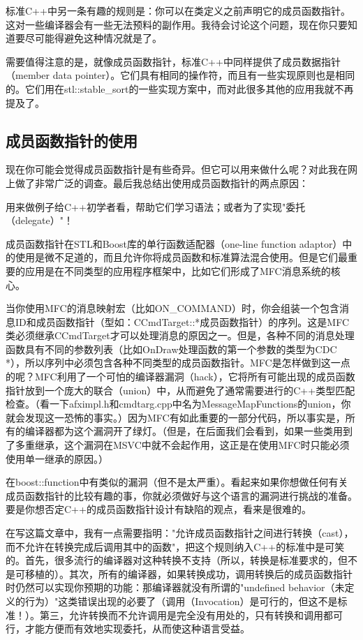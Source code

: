 \documentclass{article}
\begin{document}
\begin{CJK}{UTF8}{gbsn}
标准C++中另一条有趣的规则是：你可以在类定义之前声明它的成员函数指针。这对一些编译器会有一些无法预料的副作用。我待会讨论这个问题，现在你只要知道要尽可能得避免这种情况就是了。

需要值得注意的是，就像成员函数指针，标准C++中同样提供了成员数据指针（member data pointer）。它们具有相同的操作符，而且有一些实现原则也是相同的。它们用在stl::stable\_sort的一些实现方案中，而对此很多其他的应用我就不再提及了。

\subsection{成员函数指针的使用}
现在你可能会觉得成员函数指针是有些奇异。但它可以用来做什么呢？对此我在网上做了非常广泛的调查。最后我总结出使用成员函数指针的两点原因：

用来做例子给C++初学者看，帮助它们学习语法；或者为了实现"委托（delegate）"！ 

成员函数指针在STL和Boost库的单行函数适配器（one-line function adaptor）中的使用是微不足道的，而且允许你将成员函数和标准算法混合使用。但是它们最重要的应用是在不同类型的应用程序框架中，比如它们形成了MFC消息系统的核心。

当你使用MFC的消息映射宏（比如ON\_COMMAND）时，你会组装一个包含消息ID和成员函数指针（型如：CCmdTarget::*成员函数指针）的序列。这是MFC类必须继承CCmdTarget才可以处理消息的原因之一。但是，各种不同的消息处理函数具有不同的参数列表（比如OnDraw处理函数的第一个参数的类型为CDC *），所以序列中必须包含各种不同类型的成员函数指针。MFC是怎样做到这一点的呢？MFC利用了一个可怕的编译器漏洞（hack），它将所有可能出现的成员函数指针放到一个庞大的联合（union）中，从而避免了通常需要进行的C++类型匹配检查。（看一下afximpl.h和cmdtarg.cpp中名为MessageMapFunctions的union，你就会发现这一恐怖的事实。）因为MFC有如此重要的一部分代码，所以事实是，所有的编译器都为这个漏洞开了绿灯。（但是，在后面我们会看到，如果一些类用到了多重继承，这个漏洞在MSVC中就不会起作用，这正是在使用MFC时只能必须使用单一继承的原因。）

在boost::function中有类似的漏洞（但不是太严重）。看起来如果你想做任何有关成员函数指针的比较有趣的事，你就必须做好与这个语言的漏洞进行挑战的准备。要是你想否定C++的成员函数指针设计有缺陷的观点，看来是很难的。

在写这篇文章中，我有一点需要指明："允许成员函数指针之间进行转换（cast），而不允许在转换完成后调用其中的函数"，把这个规则纳入C++的标准中是可笑的。首先，很多流行的编译器对这种转换不支持（所以，转换是标准要求的，但不是可移植的）。其次，所有的编译器，如果转换成功，调用转换后的成员函数指针时仍然可以实现你预期的功能：那编译器就没有所谓的"undefined behavior（未定义的行为）"这类错误出现的必要了（调用（Invocation）是可行的，但这不是标准！）。第三，允许转换而不允许调用是完全没有用处的，只有转换和调用都可行，才能方便而有效地实现委托，从而使这种语言受益。


\end{CJK}
\end{document}
